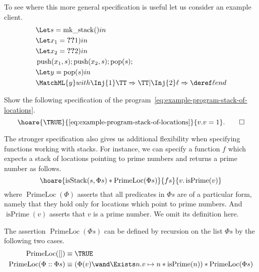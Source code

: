 To see where this more general specification is useful let us consider an example client.
\begin{align}
  \label{eq:example-program-stack-of-locations}
  \begin{split}
    &\Let s = \operatorname{mk\_stack} () in \\
    &\Let x_1 = \Ref(1) in \\
    &\Let x_2 = \Ref(2) in \\
    & \operatorname{push}(x_1,s); \operatorname{push}(x_2,s); \operatorname{pop}(s);\\
    & \Let y = \operatorname{pop}(s) in\\
    & \MatchML{y}with\Inj{1} \TT=>{\TT}|{\Inj{2} \ell}=>{\deref \ell}end{}
  \end{split}
\end{align}
\begin{exercise}
  Show the following specification of the program~\eqref{eq:example-program-stack-of-locations}.
  \begin{displaymath}
    \hoare{\TRUE}{\eqref{eq:example-program-stack-of-locations}}{v.v = 1}. \qedhere
  \end{displaymath}
\end{exercise}


\newcommand{\isPrime}{\ensuremath{\operatorname{isPrime}}}
\newcommand{\primelocs}{\ensuremath{\operatorname{PrimeLoc}}}

The stronger specification also gives us additional flexibility when specifying functions working with stacks.
For instance, we can specify a function $f$ which expects a stack of locations pointing to prime numbers and returns a prime number as follows.
\begin{displaymath}
  \hoare{\mathrm{isStack}(s, \Phi{s}) \ast \primelocs(\Phi{s})}{f s}{v. \isPrime(v)}
\end{displaymath}
where $\primelocs(\Phi)$ asserts that all predicates in $\Phi{s}$ are of a particular form, namely that they hold only for locations which point to prime numbers.
And $\isPrime(v)$ asserts that $v$ is a prime number.
We omit its definition here.

The assertion $\primelocs(\Phi{s})$ can be defined by recursion on the list $\Phi{s}$ by the following two cases.
\begin{align*}
  \primelocs([]) &\equiv \TRUE\\
  \primelocs(\Phi :: \Phi{s}) &\equiv \left(\Phi(v) \wand \Exists n . v \pointsto n \ast \isPrime(n)\right) \ast \primelocs(\Phi{s})
\end{align*}

